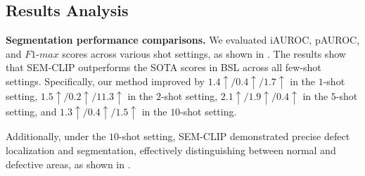 \subsection{Results Analysis}
\noindent
\textbf{Segmentation performance comparisons.}
We evaluated iAUROC, pAUROC, and $F1$-$max$ scores across various shot settings, as shown in .
The results show that SEM-CLIP outperforms the SOTA scores in BSL across all few-shot settings. Specifically, our method improved by $1.4\uparrow/0.4\uparrow/1.7\uparrow$ in the $1$-shot setting, $1.5\uparrow/0.2\uparrow/11.3\uparrow$ in the $2$-shot setting, $2.1\uparrow/1.9\uparrow/0.4\uparrow$ in the $5$-shot setting, and $1.3\uparrow/0.4\uparrow/1.5\uparrow$ in the $10$-shot setting.

Additionally, under the $10$-shot setting, SEM-CLIP demonstrated precise defect localization and segmentation, effectively distinguishing between normal and defective areas, as shown in .




